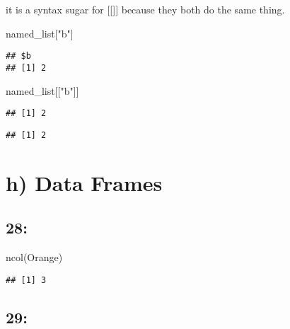 \documentclass[
]{article}
\newenvironment{Shaded}{\begin{snugshade}}{\end{snugshade}}
\newcommand{\FunctionTok}[1]{\textcolor[rgb]{0.00,0.00,0.00}{#1}}
\newcommand{\NormalTok}[1]{#1}
\newcommand{\SpecialCharTok}[1]{\textcolor[rgb]{0.00,0.00,0.00}{#1}}
\newcommand{\StringTok}[1]{\textcolor[rgb]{0.31,0.60,0.02}{#1}}
\begin{document}
it is a syntax sugar for {[}{[}{]}{]} because they both do the same
thing.

\begin{Shaded}
\begin{Highlighting}[]
\NormalTok{named\_list[}\StringTok{"b"}\NormalTok{]}
\end{Highlighting}
\end{Shaded}

\begin{verbatim}
## $b
## [1] 2
\end{verbatim}

\begin{Shaded}
\begin{Highlighting}[]
\NormalTok{named\_list[[}\StringTok{"b"}\NormalTok{]]}
\end{Highlighting}
\end{Shaded}

\begin{verbatim}
## [1] 2
\end{verbatim}

\begin{Shaded}
\end{Shaded}

\begin{verbatim}
## [1] 2
\end{verbatim}

\hypertarget{h-data-frames}{%
\section{h) Data Frames}\label{h-data-frames}}

\hypertarget{section-27}{%
\subsection{28:}\label{section-27}}

\begin{Shaded}
\begin{Highlighting}[]
\FunctionTok{ncol}\NormalTok{(Orange)}
\end{Highlighting}
\end{Shaded}

\begin{verbatim}
## [1] 3
\end{verbatim}

\hypertarget{section-28}{%
\subsection{29:}\label{section-28}}
\end{document}
